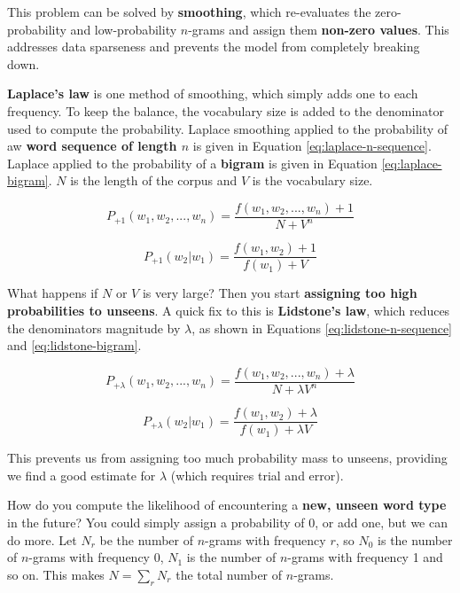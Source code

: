 \documentclass{article}
\begin{document}
This problem can be solved by \textbf{smoothing}, which re-evaluates the zero-probability and low-probability $n$-grams and assign them \textbf{non-zero values}. This addresses data sparseness and prevents the model from completely breaking down.

\textbf{Laplace's law} is one method of smoothing, which simply adds one to each frequency. To keep the balance, the vocabulary size is added to the denominator used to compute the probability. Laplace smoothing applied to the probability of aw \textbf{word sequence of length $n$} is given in Equation \ref{eq:laplace-n-sequence}. Laplace applied to the probability of a \textbf{bigram} is given in Equation \ref{eq:laplace-bigram}. $N$ is the length of the corpus and $V$ is the vocabulary size.

\begin{equation}
	P_{+1}(w_1,w_2,...,w_n) = \frac{f(w_1,w_2,...,w_n) + 1}{N + V^{n}}
	\label{eq:laplace-n-sequence}
\end{equation}

\begin{equation}
	P_{+1}(w_2|w_1) = \frac{f(w_1,w_2) + 1}{f(w_1) + V}
	\label{eq:laplace-bigram}
\end{equation}

What happens if $N$ or $V$ is very large? Then you start \textbf{assigning too high probabilities to unseens}. A quick fix to this is \textbf{Lidstone's law}, which reduces the denominators magnitude by $\lambda$, as shown in Equations \ref{eq:lidstone-n-sequence} and \ref{eq:lidstone-bigram}.

\begin{equation}
	P_{+\lambda}(w_1,w_2,...,w_n) = \frac{f(w_1,w_2,...,w_n) + \lambda}{N + \lambda V^{n}}
	\label{eq:lidstone-n-sequence}
\end{equation}

\begin{equation}
	P_{+\lambda}(w_2|w_1) = \frac{f(w_1,w_2) + \lambda}{f(w_1) + \lambda V}
	\label{eq:lidstone-bigram}
\end{equation}

This prevents us from assigning too much probability mass to unseens, providing we find a good estimate for $\lambda$ (which requires trial and error).

How do you compute the likelihood of encountering a \textbf{new, unseen word type} in the future? You could simply assign a probability of 0, or add one, but we can do more. Let $N_r$ be the number of $n$-grams with frequency $r$, so $N_0$ is the number of $n$-grams with frequency 0, $N_1$ is the number of $n$-grams with frequency 1 and so on. This makes $N = \sum_{r} {N_r}$ the total number of $n$-grams.
\end{document}
